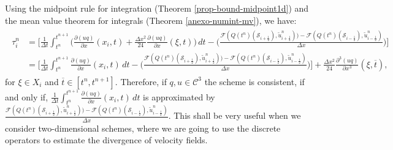 Using the midpoint rule for integration (Theorem \ref{prop-bound-midpoint1d}) and the mean value theorem for integrals
(Theorem \ref{anexo-numint-mv}), 
we have:
\begin{align}
	\begin{split}
		\label{consistency-1d-eq3}
		\tau_{i}^n 
		&= 
		\bigg[ \frac{1}{\Delta t}  \int_{t^{n}}^{t^{n+1}}
		{\bigg(\frac{\partial (uq)}{\partial x}}(x_i, t) + \frac{\Delta x^2}{24}\frac{\partial (uq)}{\partial x}(\xi, t) \bigg) \,dt - 
		\bigg(\frac{\mathcal{F}(Q(t^n)(\mathcal{S}_{i+\frac{1}{2}}),\tilde{u}^n_{i+\frac{1}{2}})) 
			-\mathcal{F}(Q(t^n)(\mathcal{S}_{i-\frac{1}{2}}),\tilde{u}^n_{i-\frac{1}{2}})}{\Delta x} \bigg)
		\bigg] \\
		& = 
		\bigg[ \frac{1}{\Delta t}  \int_{t^{n}}^{t^{n+1}}
		{\frac{\partial (uq)}{\partial x}}(x_i, t) \,dt - 
		\bigg(\frac{\mathcal{F}(Q(t^n)(\mathcal{S}_{i+\frac{1}{2}}),\tilde{u}^n_{i+\frac{1}{2}})) -\mathcal{F}(Q(t^n)(\mathcal{S}_{i-\frac{1}{2}}),\tilde{u}^n_{i-\frac{1}{2}})}{\Delta x} \bigg)
		\bigg] +  \frac{\Delta x^2}{24}\frac{\partial^3 (uq)}{\partial x^3}(\xi, \overline{t}), 
	\end{split}
\end{align}
for $\xi \in X_i$ and $\overline{t} \in [t^{n},t^{n+1}]$. Therefore, if $q,u \in \mathcal{C}^3$ the scheme is
consistent, if and only if, $\frac{1}{\Delta t}  \int_{t^{n}}^{t^{n+1}} {\frac{\partial (uq)}{\partial x}}(x_i, t) \,dt$
is approximated by 
$\frac{\mathcal{F}(Q(t^n)(\mathcal{S}_{i+\frac{1}{2}}),\tilde{u}^n_{i+\frac{1}{2}})) -\mathcal{F}(Q(t^n)(\mathcal{S}_{i-\frac{1}{2}} ),\tilde{u}^n_{i-\frac{1}{2}})}{\Delta x}$.
This shall be very useful when we consider two-dimensional schemes, where we are going to use the discrete operators to estimate the divergence
of velocity fields.

